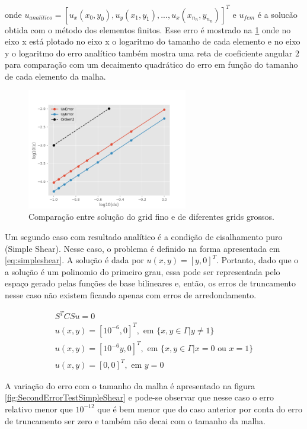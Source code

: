 onde $u_{analitico} = [u_x(x_0, y_0), u_y(x_1, y_1), ..., u_x(x_{n_n}, y_{n_n})] ^ T$ e $u_{fem}$ é a solucão obtida com o método dos elementos finitos. Esse erro é mostrado na \ref{fig:SecondOrderTest} onde no eixo x 
está plotado no eixo x o logaritmo do tamanho de cada elemento e no eixo y o logaritmo do erro analítico também mostra uma reta de coeficiente angular $2$ para comparação com um decaimento
quadrático do erro em função do tamanho de cada elemento da malha.

\begin{figure}[!htbp]
    \label{fig:SecondOrderTest}
    \centering
    \includegraphics[width=7cm]{chap08/figs/SecondErrorTest.png}
    \caption{Comparação entre solução do grid fino e de diferentes grids grossos.}
\end{figure}
    
Um segundo caso com resultado analítico é a condição de cisalhamento puro (Simple Shear). 
Nesse caso, o problema é definido na forma apresentada em \ref{eq:simpleshear}. A solução
é dada por $u(x,y) = [y, 0]^T$. Portanto, dado que o a solução é um polinomio do primeiro grau,
essa pode ser representada pelo espaço gerado pelas funções de base bilineares e, então,
os erros de truncamento nesse caso não existem ficando apenas com erros de arredondamento.

\begin{equation}\label{eq:simpleshear}
    \begin{aligned}
        S^T C S u = 0 \\
        u(x,y) = [10^{-6}, 0]^T, \text{ em } \{x, y \in \Gamma | y \neq 1\} \\
        u(x,y) = [10^{-6}y, 0]^T, \text{ em } \{x, y \in \Gamma | x = 0 \text{ ou } x = 1\} \\
        u(x,y) = [0, 0]^T, \text{ em } y=0
    \end{aligned}
\end{equation}

A variação do erro com o tamanho da malha é apresentado na figura \ref{fig:SecondErrorTestSimpleShear} e pode-se observar que
nesse caso o erro relativo menor que $10^{-12}$ que é bem menor que do caso anterior por conta do erro de truncamento ser zero e também
não decai com o tamanho da malha.


